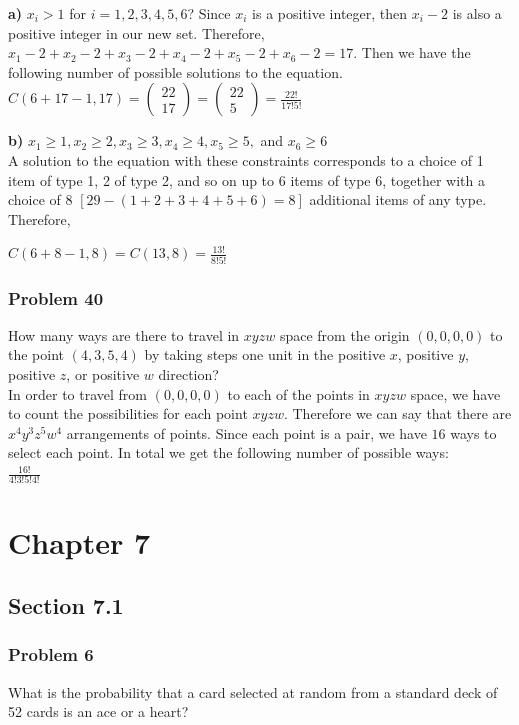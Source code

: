 \documentclass[fontsize=11pt]{scrartcl} %
\newcommand{\combination}[2]{
\begin{pmatrix}#1\\#2\end{pmatrix}
}
\begin{document}
\textbf{a)} $x_i > 1$ for $i=1,2,3,4,5,6$?
Since $x_i$ is a positive integer, then $x_i - 2$ is also a positive integer in our new set. Therefore, $x_1 - 2 + x_2 - 2 + x_3 - 2 + x_4 - 2 + x_5 -2 + x_6 - 2 = 17$. Then we have the following number of possible solutions to the equation.\\
$C(6+17-1, 17) = \combination{22}{17} = \combination{22}{5} = \frac{22!}{17!5!}$

\textbf{b)} $x_1 \ge 1, x_2 \ge 2, x_3 \ge 3, x_4 \ge 4, x_5 \ge 5,$ and $x_6 \ge 6$\\
A solution to the equation with these constraints corresponds to a choice of 1 item of type 1, 2 of type 2, and so on up to 6 items of type 6, together with a choice of 8  $[29 - (1+2+3+4+5+6)=8]$ additional items of any type. Therefore,

$C(6+8-1,8) = C(13,8) = \frac{13!}{8!5!}$\\

\subsubsection*{Problem 40} 
How many ways are there to travel in $xyzw$ space from the origin $(0, 0, 0, 0)$ to the point $(4, 3, 5, 4)$ by taking steps one unit in the positive $x$, positive $y$, positive $z$, or positive $w$ direction?\\

In order to travel from $(0,0,0,0)$ to each of the points in $xyzw$ space, we have to count the possibilities for each point $xyzw$. Therefore we can say that there are $x^4y^3z^5w^4$ arrangements of points. Since each point is a pair, we have $16$ ways to select each point. In total we get the following number of possible ways:\\
$\frac{16!}{4!3!5!4!}$\\

\section*{Chapter 7}
\subsection*{Section 7.1}
\subsubsection*{Problem 6} 
What is the probability that a card selected at random from a standard deck of 52 cards is an ace or a heart?\\
\end{document}
